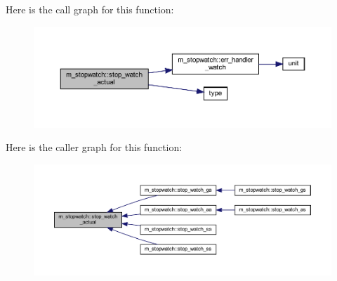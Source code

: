 Here is the call graph for this function\+:
\nopagebreak
\begin{figure}[H]
\begin{center}
\leavevmode
\includegraphics[width=350pt]{namespacem__stopwatch_a24cd395f8edd9999704a1ba6444267e8_cgraph}
\end{center}
\end{figure}
Here is the caller graph for this function\+:
\nopagebreak
\begin{figure}[H]
\begin{center}
\leavevmode
\includegraphics[width=350pt]{namespacem__stopwatch_a24cd395f8edd9999704a1ba6444267e8_icgraph}
\end{center}
\end{figure}
\mbox{\label{namespacem__stopwatch_aa9adc6b0a3fa0ccf5c542000f0b7925c}} 

